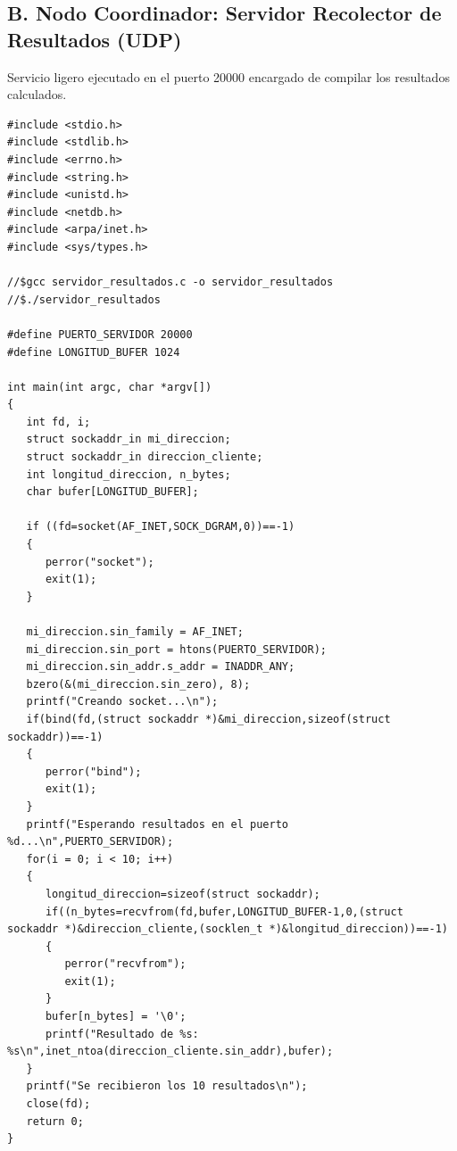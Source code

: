 \subsection*{B. Nodo Coordinador: Servidor Recolector de Resultados (UDP)}
Servicio ligero ejecutado en el puerto 20000 encargado de compilar los resultados calculados.
\begin{lstlisting}[style=C, caption={Implementación del servidor de resultados (servidor\_resultados.c)}]
#include <stdio.h>
#include <stdlib.h>
#include <errno.h>
#include <string.h>
#include <unistd.h>
#include <netdb.h>
#include <arpa/inet.h>
#include <sys/types.h>

//$gcc servidor_resultados.c -o servidor_resultados
//$./servidor_resultados

#define PUERTO_SERVIDOR 20000
#define LONGITUD_BUFER 1024

int main(int argc, char *argv[])
{
   int fd, i;
   struct sockaddr_in mi_direccion;
   struct sockaddr_in direccion_cliente;
   int longitud_direccion, n_bytes;
   char bufer[LONGITUD_BUFER];

   if ((fd=socket(AF_INET,SOCK_DGRAM,0))==-1)
   {
      perror("socket");
      exit(1);
   }

   mi_direccion.sin_family = AF_INET;
   mi_direccion.sin_port = htons(PUERTO_SERVIDOR);
   mi_direccion.sin_addr.s_addr = INADDR_ANY;
   bzero(&(mi_direccion.sin_zero), 8);
   printf("Creando socket...\n");
   if(bind(fd,(struct sockaddr *)&mi_direccion,sizeof(struct sockaddr))==-1)
   {
      perror("bind");
      exit(1);
   }
   printf("Esperando resultados en el puerto %d...\n",PUERTO_SERVIDOR);
   for(i = 0; i < 10; i++)
   {
      longitud_direccion=sizeof(struct sockaddr);
      if((n_bytes=recvfrom(fd,bufer,LONGITUD_BUFER-1,0,(struct sockaddr *)&direccion_cliente,(socklen_t *)&longitud_direccion))==-1)
      {
         perror("recvfrom");
         exit(1);
      }
      bufer[n_bytes] = '\0';
      printf("Resultado de %s: %s\n",inet_ntoa(direccion_cliente.sin_addr),bufer);
   }
   printf("Se recibieron los 10 resultados\n");
   close(fd);
   return 0;
}
\end{lstlisting}

